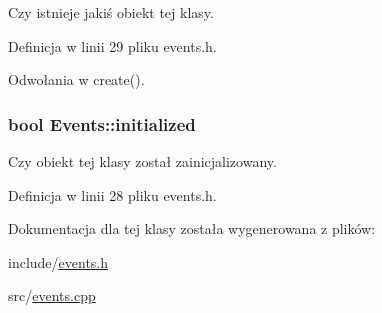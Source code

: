 Czy istnieje jakiś obiekt tej klasy. 



Definicja w linii 29 pliku events.h.



Odwołania w create().

\hypertarget{classEvents_a155926e71d11323e83ceb574177b01cb}{
\subsubsection[{initialized}]{\setlength{\rightskip}{0pt plus 5cm}bool {\bf Events::initialized}}}
\label{classEvents_a155926e71d11323e83ceb574177b01cb}


Czy obiekt tej klasy został zainicjalizowany. 



Definicja w linii 28 pliku events.h.



Dokumentacja dla tej klasy została wygenerowana z plików:\begin{DoxyCompactItemize}
\item 
include/\hyperlink{events_8h}{events.h}\item 
src/\hyperlink{events_8cpp}{events.cpp}\end{DoxyCompactItemize}
